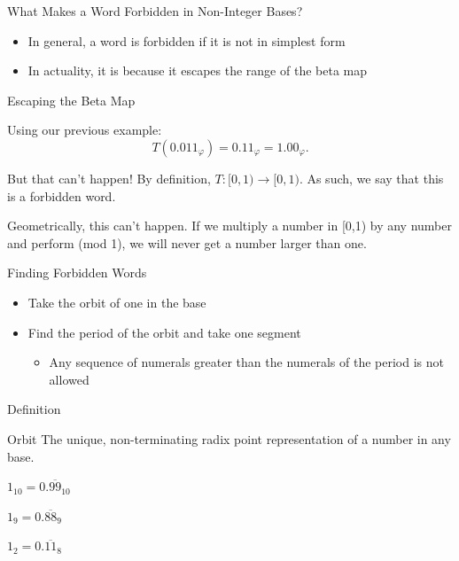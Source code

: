 \documentclass{beamer}
\begin{document}
\begin{frame}{What Makes a Word Forbidden in Non-Integer Bases?}
  \begin{itemize}
    \item In general, a word is forbidden if it is not in simplest form \pause
    \item In actuality, it is because it escapes the range of the beta map
  \end{itemize}
\end{frame}

\begin{frame}{Escaping the Beta Map}
  \begin{example}
    Using our previous example:
    $$T(0.011_\varphi)=0.11_\varphi=1.00_\varphi.$$ \pause

    But that can't happen! By definition, $T:[0,1)\to[0,1)$. As such, we say that this is a forbidden word. \pause

    Geometrically, this can't happen. If we multiply a number in [0,1) by any number and perform (mod 1), we will never get a number larger than one.
  \end{example}
\end{frame}

\begin{frame}{Finding Forbidden Words}
  \begin{itemize}
    \item Take the orbit of one in the base \pause
    \item Find the period of the orbit and take one segment \pause
    \begin{itemize}
      \item Any sequence of numerals greater than the numerals of the period is not allowed
    \end{itemize}
  \end{itemize}
\end{frame}

\begin{frame}{Definition}
  \begin{block}{Orbit}
    The unique, non-terminating radix point representation of a number in any base.
  \end{block}\pause

  \begin{example} \pause
    $1_{10} = 0.\overline{99}_{10}$ \pause

    $1_{9} = 0.\overline{88}_{9}$ \pause

    $1_{2} = 0.\overline{11}_{8}$
  \end{example}
\end{frame}
\end{document}
